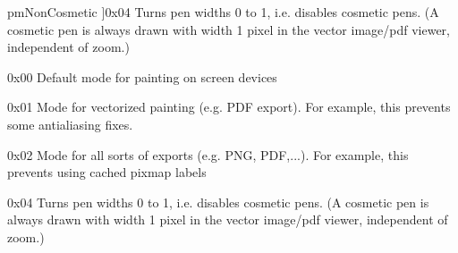 \begin{Desc}
\begin{description}
{pm\+Non\+Cosmetic\hypertarget{class_q_c_p_painter_a156cf16444ff5e0d81a73c615fdb156dab1f50f65b248c5222d1d826cc01c837a}{}\label{class_q_c_p_painter_a156cf16444ff5e0d81a73c615fdb156dab1f50f65b248c5222d1d826cc01c837a}
}]{\ttfamily 0x04} Turns pen widths 0 to 1, i.\+e. disables cosmetic pens. (A cosmetic pen is always drawn with width 1 pixel in the vector image/pdf viewer, independent of zoom.) \item[{\em 
pm\+Default\hypertarget{class_q_c_p_painter_a156cf16444ff5e0d81a73c615fdb156daf70f0b3a3322c7edb6273a817ef9efcd}{}\label{class_q_c_p_painter_a156cf16444ff5e0d81a73c615fdb156daf70f0b3a3322c7edb6273a817ef9efcd}
}]{\ttfamily 0x00} Default mode for painting on screen devices \item[{\em 
pm\+Vectorized\hypertarget{class_q_c_p_painter_a156cf16444ff5e0d81a73c615fdb156daa4e636d20dd73397079efd4900abe5dd}{}\label{class_q_c_p_painter_a156cf16444ff5e0d81a73c615fdb156daa4e636d20dd73397079efd4900abe5dd}
}]{\ttfamily 0x01} Mode for vectorized painting (e.\+g. P\+DF export). For example, this prevents some antialiasing fixes. \item[{\em 
pm\+No\+Caching\hypertarget{class_q_c_p_painter_a156cf16444ff5e0d81a73c615fdb156da8ce8e67295145ede7599425bdfaaceff}{}\label{class_q_c_p_painter_a156cf16444ff5e0d81a73c615fdb156da8ce8e67295145ede7599425bdfaaceff}
}]{\ttfamily 0x02} Mode for all sorts of exports (e.\+g. P\+NG, P\+DF,...). For example, this prevents using cached pixmap labels \item[{\em 
pm\+Non\+Cosmetic\hypertarget{class_q_c_p_painter_a156cf16444ff5e0d81a73c615fdb156dab1f50f65b248c5222d1d826cc01c837a}{}\label{class_q_c_p_painter_a156cf16444ff5e0d81a73c615fdb156dab1f50f65b248c5222d1d826cc01c837a}
}]{\ttfamily 0x04} Turns pen widths 0 to 1, i.\+e. disables cosmetic pens. (A cosmetic pen is always drawn with width 1 pixel in the vector image/pdf viewer, independent of zoom.) \end{description}
\end{Desc}
